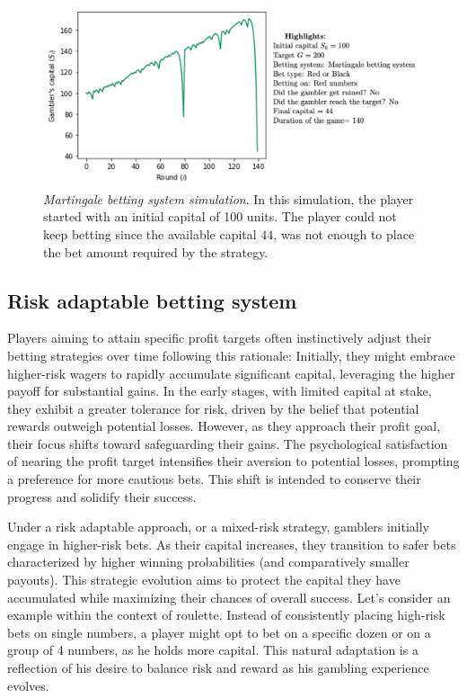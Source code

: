 \documentclass[11pt,twoside]{article}
\numberwithin{Theorem}{section}
\numberwithin{Definition}{section}
\numberwithin{Lemma}{section}
\numberwithin{Algorithm}{section}
\numberwithin{equation}{section}
\begin{document}
\begin{figure}[H]
        \centering
        \includegraphics[width=13 cm]{mart_ex_1.png}
        \caption[Martingale betting system simulation]{\textit{Martingale  betting system simulation}. In this simulation, the player started with an initial capital of 100 units. The player could not keep betting since the available capital $44$, was not enough to place the bet amount required by the strategy.}\label{sim_03}
\end{figure}


\subsection{Risk adaptable betting system}

Players aiming to attain specific profit targets often instinctively adjust their betting strategies over time following this rationale: Initially, they might embrace higher-risk wagers to rapidly accumulate significant capital, leveraging the higher payoff for substantial gains. In the early stages, with limited capital at stake, they exhibit a greater tolerance for risk, driven by the belief that potential rewards outweigh potential losses. However, as they approach their profit goal, their focus shifts toward safeguarding their gains. The psychological satisfaction of nearing the profit target intensifies their aversion to potential losses, prompting a preference for more cautious bets. This shift is intended to conserve their progress and solidify their success.

Under a risk adaptable approach, or a mixed-risk strategy, gamblers initially engage in higher-risk bets. As their capital increases, they transition to safer bets characterized by higher winning probabilities (and comparatively smaller payouts). This strategic evolution aims to protect the capital they have accumulated while maximizing their chances of overall success. Let's consider an example within the context of roulette. Instead of consistently placing high-risk bets on single numbers, a player might opt to bet on a specific dozen or on a group of 4 numbers, as he holds more capital. This natural adaptation is a reflection of his desire to balance risk and reward as his gambling experience evolves.
\end{document}
